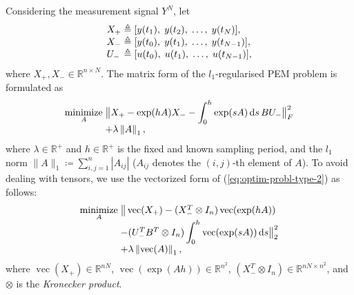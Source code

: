 \documentclass[letterpaper,10pt,journal,final]{IEEEtran}
\theoremstyle{definition}
\theoremstyle{remark}
\newcommand{\kvec}{\operatorname{vec}}
\newcommand{\minimize}[1]{\underset{#1}{\operatorname{minimize}}}  \newcommand{\st}{\operatorname{subject\ to}}
\begin{document}
Considering the measurement signal $Y^N$, let
\begin{equation*}
  \begin{array}{l@{\;}l}
    X_+ &\triangleq [ y(t_1),\; y(t_2),\; \dots,\; y(t_N) ],\\
    X_- &\triangleq [ y(t_0),\; y(t_1),\; \dots,\; y(t_{N-1}) ],\\
    U_- &\triangleq [ u(t_0),\; u(t_1),\; \dots,\; u(t_{N-1}) ],
  \end{array}
\end{equation*}
where $X_+,X_- \in \mathbb{R}^{n \times N}$.
The matrix form of the $l_1$-regularised PEM problem is formulated as
\begin{equation}
  \label{eq:optim-probl-type-2}
  \begin{array}{l@{\;}l}
    \minimize{A} &  \big\| X_+ - \exp(hA) X_- - \displaystyle\int_0^h
                   \exp(sA)\,\mathrm{d}s\, B U_- \big\|_F^2 \\
                 &+ \lambda \left\| A \right\|_1,
  \end{array}
\end{equation}
where $\lambda \in \mathbb{R}^+$ and $h \in \mathbb{R}^+$ is the fixed and known
sampling period, and the $l_1$ norm $\| A \|_1 \coloneqq \sum_{i,j=1}^n |A_{ij}|$
($A_{ij}$ denotes the $(i,j)$-th element of $A$).  To avoid dealing with tensors, we
use the vectorized form of (\ref{eq:optim-probl-type-2}) as follows:
\begin{equation}
  \label{eq:optim-probl-kron-type-2}
  \begin{array}{l@{\;}l}
    \minimize{A} &  \big\| \kvec(X_+) - (X_-^{T} \otimes I_n) \kvec(\exp(hA)) \\
                 &-(U_-^TB^T \otimes I_n) \displaystyle\int_0^h \kvec(\exp(sA))\,\mathrm{d}s \big\|_2^2\\
                 &+ \lambda \left\| \kvec(A) \right\|_1,
  \end{array}
\end{equation}
where $\kvec (X_+) \in \mathbb{R}^{nN}$, $\kvec (\exp(A h)) \in \mathbb{R}^{n^2}$,
$(X_-^{T} \otimes I_n) \in \mathbb{R}^{nN \times n^2}$, and $\otimes$ is the
\emph{Kronecker product}.
\end{document}
